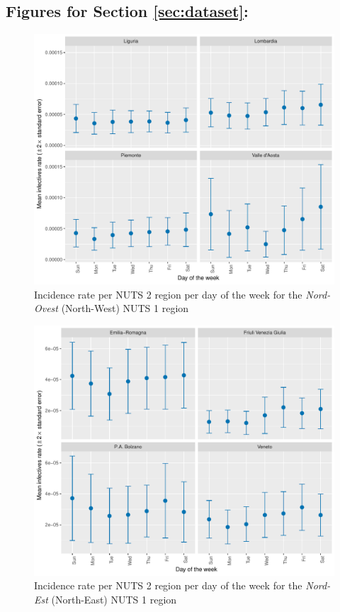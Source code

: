 \documentclass[12pt]{article}
\begin{document}
\begin{appendices}
		\subsection{Figures for Section \ref{sec:dataset}: } \label{sapp:figures_dataset}
		
		\begin{figure}[H]
    	    \centering
    	    \includegraphics[width=\textwidth]{output/infective_rates_weekday_Nord-Ovest.pdf}
    	    \caption{Incidence rate per NUTS 2 region per day of the week for the \textit{Nord-Ovest} (North-West) NUTS 1 region}
    	    \label{fig:incidence_nordovest_weekday}
    	\end{figure}
		
		\begin{figure}[H]
    	    \centering
    	    \includegraphics[width=\textwidth]{output/infective_rates_weekday_Nord-Est.pdf}
    	    \caption{Incidence rate per NUTS 2 region per day of the week for the \textit{Nord-Est} (North-East) NUTS 1 region}
    	    \label{fig:incidence_nordest_weekday}
    	\end{figure}
    	

\end{appendices}
\end{document}
